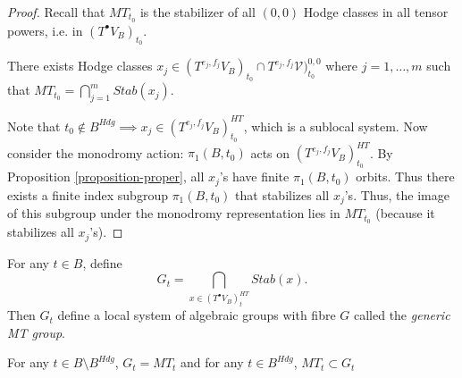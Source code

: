 \begin{proof}
Recall that $MT_{t_0}$ is the stabilizer of
all
$(0,0)$ Hodge classes in
all tensor powers, i.e. in $(T^\bullet
V_B)_{t_0}$.

There exists Hodge classes
$x_j \in (T^{e_j,f_j}V_B)_{t_0}\cap
T^{e_j,f_j}\mathcal{V})^{0,0}_{t_0}$
where $j=1,…,m$
such that $MT_{t_0}=\bigcap_{j=1}^m
Stab(x_j)$.

Note that $t_0 \not\in B^{Hdg}\implies
x_j\in(T^{e_j,f_j}V_B)^{HT}_{t_0}$,
which is a sublocal system.
Now consider the monodromy action:
$\pi_1(B,t_0)$ acts on
$(T^{e_j,f_j}V_B)^{HT}_{t_0}$.
By Proposition \ref{proposition-proper},
all $x_j$'s have finite $\pi_1(B,t_0)$
orbits.
Thus there exists a finite index subgroup
$\pi_1(B,t_0)$ that stabilizes all $x_j$'s.
Thus, the image of this subgroup under the
monodromy representation lies in $MT_{t_0}$
(because it stabilizes all $x_j$'s).
\end{proof}

\noindent
\begin{definition}
\label{definition-generic-mt-group}
For any $t \in B$, define
$$
G_t=\bigcap_{x \in (T^\bullet
V_B)_t^{HT}}Stab(x).
$$
Then $G_t$ define a local system of algebraic
groups
with fibre $G$ called the {\it generic MT
group}.
\end{definition}

For any $t \in B\setminus B^{Hdg}$,
$G_t=MT_t$
and for any $t \in B^{Hdg}$, $MT_t \subset
G_t$

